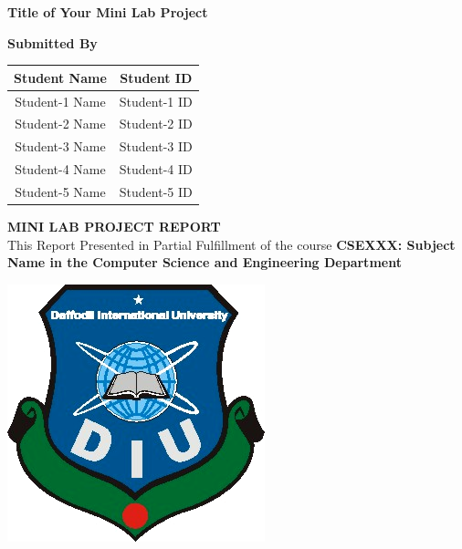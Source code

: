\begin{titlepage}

\vspace*{2cm} %

\begin{center}
{\huge\bf Title of Your Mini Lab Project}
\end{center}

\vspace{2cm}

\begin{center}
\Large \bf Submitted By
\end{center}

\vspace{.1cm}

\begin{table}[h!]
\centering
\begin{tabular}{|c|c|}
\hline
\textbf{      Student Name      } & \textbf{  Student ID  } \\
\hline
Student-1 Name & Student-1 ID \\
\hline
Student-2 Name & Student-2 ID \\
\hline
Student-3 Name & Student-3 ID \\
\hline
Student-4 Name & Student-4 ID \\
\hline
Student-5 Name & Student-5 ID \\
\hline
\end{tabular}
\end{table}

\vspace{2cm}

\begin{center}
{\Large\bf MINI LAB PROJECT REPORT}\\
\vspace{0.2cm}
\Large This Report Presented in Partial Fulfillment of the course  \textbf{CSEXXX: Subject Name in the Computer Science and Engineering Department}
\end{center}

\vspace{2cm}

\begin{center}
\includegraphics[scale=0.5]{./figures/DIU Logo}
\end{center}


\end{titlepage}
